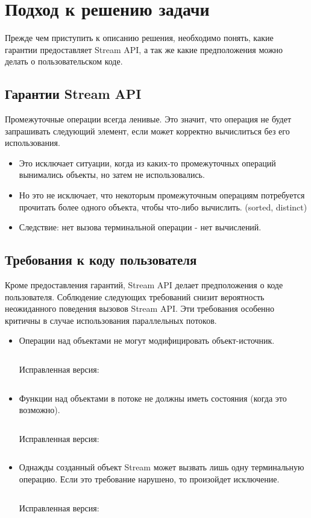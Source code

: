 \section{Подход к решению задачи}\label{chapter2}
Прежде чем приступить к описанию решения, необходимо понять, какие гарантии предоставляет Stream API, а так же какие предположения можно делать о пользовательском коде.

\subsection{Гарантии Stream API}\label{java:guarantees}
Промежуточные операции всегда ленивые. Это значит, что операция не будет запрашивать следующий элемент, если может корректно вычислиться без его использования.
\begin{itemize}
	\item Это исключает ситуации, когда из каких-то промежуточных операций вынимались объекты, но затем не использовались.
	\item Но это не исключает, что некоторым промежуточным операциям потребуется прочитать более одного объекта, чтобы что-либо вычислить. (sorted, distinct)
	\item Следствие: нет вызова терминальной операции - нет вычислений.
\end{itemize}

\subsection{Требования к коду пользователя} \label{code:demands}

Кроме предоставления гарантий, Stream API делает предположения о коде пользователя. Соблюдение следующих требований снизит вероятность неожиданного поведения вызовов Stream API. Эти требования особенно критичны в случае использования параллельных потоков.

\begin{itemize}
	\item Операции над объектами не могут модифицировать объект-источник.
	\inputminted{java}{chapter2/code/SourceModification.java}
	Исправленная версия:
	\inputminted{java}{chapter2/code/SourceModificationFixed.java}
	\item Функции над объектами в потоке не должны иметь состояния (когда это возможно).
	\inputminted{java}{chapter2/code/StatefulOperation.java}
	Исправленная версия:
	\inputminted{java}{chapter2/code/StatefulOperationFixed.java}
	\item Однажды созданный объект Stream может вызвать лишь одну терминальную операцию. Если это требование нарушено, то произойдет исключение.
	\inputminted{java}{chapter2/code/OneTermination.java}
	Исправленная версия:
	\inputminted{java}{chapter2/code/OneTerminationFixed.java}
\end{itemize}

